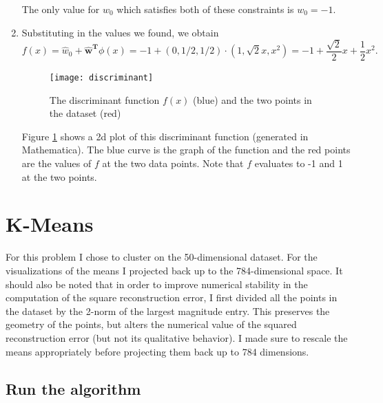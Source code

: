 \documentclass{article}
\begin{document}
\begin{enumerate}
	The only value for $w_0$ which satisfies both of these constraints is $w_0=-1$.
	\item Substituting in the values we found, we obtain
	\[
		f(x) = \hat w_0 + \bm{\hat w^T}\phi(x) = -1 + (0,1/2,1/2)\cdot(1,\sqrt{2}x,x^2) = -1 + \frac{\sqrt{2}}{2}x+\frac12x^2.
	\]
	\begin{figure}
        \centering
        \texttt{[image: discriminant]}
        \caption{The discriminant function $f(x)$ (blue) and the two points in the dataset (red)} 
        \label{fig:discr}
    \end{figure}
    Figure \ref{fig:discr} shows a 2d plot of this discriminant function (generated in Mathematica). The blue curve is the graph of the function and the red points are the values of $f$ at the two data points. Note that $f$ evaluates to -1 and 1 at the two points.
\end{enumerate}


\section{K-Means}
For this problem I chose to cluster on the 50-dimensional dataset. For the visualizations of the means I projected back up to the 784-dimensional space. It should also be noted that in order to improve numerical stability in the computation of the square reconstruction error, I first divided all the points in the dataset by the 2-norm of the largest magnitude entry. This preserves the geometry of the points, but alters the numerical value of the squared reconstruction error (but not its qualitative behavior). I made sure to rescale the means appropriately before projecting them back up to 784 dimensions.

\subsection{Run the algorithm}
\end{document}
